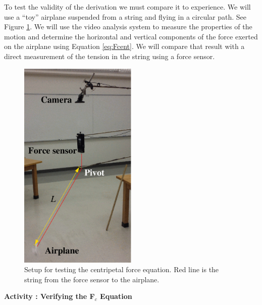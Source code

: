 To test the validity of the derivation we must compare it to experience. We
will use a ``toy'' airplane suspended from a string and flying
in a circular path. See Figure \ref{fig:airplane}. 
We will use the video analysis system to measure the properties
of the motion and determine the horizontal and vertical components of the force
exerted on the airplane using Equation \ref{eq:Fcent}. We will compare that result with a
direct measurement of the tension in the string using a force sensor. 
\begin{figure}
\begin{center}
\includegraphics[height=4.0in]{iqsCentripetalForce/airplaneSetupB.eps}
\caption{Setup for testing the centripetal force equation. Red line is the
string from the force sensor to the airplane.}\label{fig:airplane}
\end{center}
\end{figure}

\textbf{Activity : Verifying the F\( _{c} \) Equation }

